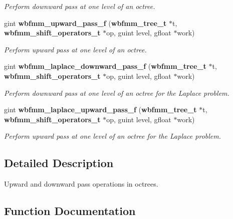 \begin{DoxyCompactItemize}
\begin{DoxyCompactList}\small\item\em Perform downward pass at one level of an octree. \end{DoxyCompactList}\item 
gint {\bf wbfmm\+\_\+upward\+\_\+pass\+\_\+f} ({\bf wbfmm\+\_\+tree\+\_\+t} $\ast$t, {\bf wbfmm\+\_\+shift\+\_\+operators\+\_\+t} $\ast$op, guint level, gfloat $\ast$work)
\begin{DoxyCompactList}\small\item\em Perform upward pass at one level of an octree. \end{DoxyCompactList}\item 
gint {\bf wbfmm\+\_\+laplace\+\_\+downward\+\_\+pass\+\_\+f} ({\bf wbfmm\+\_\+tree\+\_\+t} $\ast$t, {\bf wbfmm\+\_\+shift\+\_\+operators\+\_\+t} $\ast$op, guint level, gfloat $\ast$work)
\begin{DoxyCompactList}\small\item\em Perform downward pass at one level of an octree for the Laplace problem. \end{DoxyCompactList}\item 
gint {\bf wbfmm\+\_\+laplace\+\_\+upward\+\_\+pass\+\_\+f} ({\bf wbfmm\+\_\+tree\+\_\+t} $\ast$t, {\bf wbfmm\+\_\+shift\+\_\+operators\+\_\+t} $\ast$op, guint level, gfloat $\ast$work)
\begin{DoxyCompactList}\small\item\em Perform upward pass at one level of an octree for the Laplace problem. \end{DoxyCompactList}\end{DoxyCompactItemize}


\subsection{Detailed Description}
Upward and downward pass operations in octrees. 



\subsection{Function Documentation}
